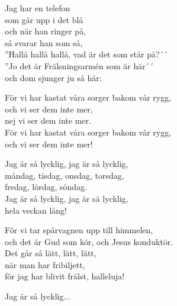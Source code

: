 \vspace{10pt}
Jag har en telefon\\
som går upp i det blå\\
och när han ringer på,\\
så svarar han som så,\\
''Hallå hallå hallå, vad är det som står på?´´\\
''Jo det är Frälsningsarmén som är här´´\\
och dom sjunger ju så här:\par
\vspace{10pt}
För vi har kastat våra sorger bakom vår rygg,\\
och vi ser dem inte mer,\\
nej vi ser dem inte mer.\\
För vi har kastat våra sorger bakom vår rygg,\\
och vi ser dem inte mer!\par
\vspace{10pt}
Jag är så lycklig, jag är så lycklig,\\
måndag, tisdag, onsdag, torsdag,\\
fredag, lördag, söndag.\\
Jag är så lycklig, jag är så lycklig,\\
hela veckan lång!\par
\vspace{10pt}
För vi tar spårvagnen upp till himmelen,\\
och det är Gud som kör, och Jesus konduktör.\\
Det går så lätt, lätt, lätt,\\
när man har fribiljett,\\
för jag har blivit frälst, halleluja!\par
\vspace{10pt}
Jag är så lycklig...
